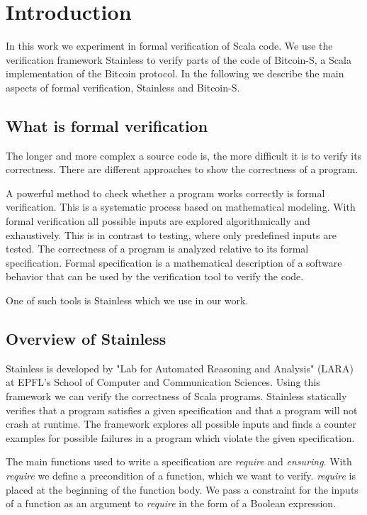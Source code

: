 \chapter{Introduction}
\label{chap:introduction}

In this work we experiment in formal verification of Scala code. 
We use the verification framework Stainless to verify parts of the code of Bitcoin-S, a Scala implementation of the Bitcoin protocol.
In the following we describe the main aspects of formal verification, Stainless and Bitcoin-S.


\section{What is formal verification}
\label{sec:formal_verification}

The longer and more complex a source code is, the more difficult it is to verify its correctness.
There are different approaches to show the correctness of a program.

A powerful method to check whether a program works correctly is formal verification.
This is a systematic process based on mathematical modeling.
With formal verification all possible inputs are explored algorithmically and exhaustively.
This is in contrast to testing, where only predefined inputs are tested.
The correctness of a program is analyzed relative to its formal specification.
Formal specification is a mathematical description of a software behavior that can be used by the verification tool to verify the code.\cite{sanghavi:formal_verification}

One of such tools is Stainless which we use in our work.


\section{Overview of Stainless}
\label{sec:stainless}

Stainless is developed by "Lab for Automated Reasoning and Analysis" (LARA) at EPFL's School of Computer and Communication Sciences.
Using this framework we can verify the correctness of Scala programs.
Stainless statically verifies that a program satisfies a given specification and that a program will not crash at runtime.
The framework explores all possible inputs and finds a counter examples for possible failures in a program which violate the given specification.\cite{Stainless:introduction}

The main functions used to write a specification are \textit{require} and \textit{ensuring}. 
With \textit{require} we define a precondition of a function, which we want to verify.
\textit{require} is placed at the beginning of the function body.
We pass a constraint for the inputs of a function as an argument to \textit{require} in the form of a Boolean expression.

